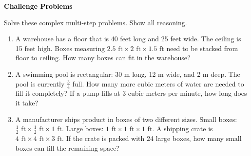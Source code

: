 \documentclass[12pt, letterpaper, fleqn]{article}
\begin{document}
\newpage

\begin{tcolorbox}[colback=black!10]
\large\textcolor{black}{\textbf{Challenge Problems}}
\end{tcolorbox}

\noindent
Solve these complex multi-step problems. Show all reasoning.

\vspace{3mm}

\begin{enumerate}[itemsep=2cm, leftmargin=0.6cm]

\item A warehouse has a floor that is 40 feet long and 25 feet wide. The ceiling is 15 feet high. Boxes measuring $2.5\text{ ft} \times 2\text{ ft} \times 1.5\text{ ft}$ need to be stacked from floor to ceiling. How many boxes can fit in the warehouse?

\vspace{2.3cm}

\item A swimming pool is rectangular: 30 m long, 12 m wide, and 2 m deep. The pool is currently $\frac{3}{4}$ full. How many more cubic meters of water are needed to fill it completely? If a pump fills at 3 cubic meters per minute, how long does it take?

\vspace{2.3cm}

\item A manufacturer ships product in boxes of two different sizes. Small boxes: $\frac{1}{2}\text{ ft} \times \frac{1}{2}\text{ ft} \times 1\text{ ft}$. Large boxes: $1\text{ ft} \times 1\text{ ft} \times 1\text{ ft}$. A shipping crate is $4\text{ ft} \times 4\text{ ft} \times 3\text{ ft}$. If the crate is packed with 24 large boxes, how many small boxes can fill the remaining space?

\vspace{2.5cm}

\end{enumerate}
\end{document}
